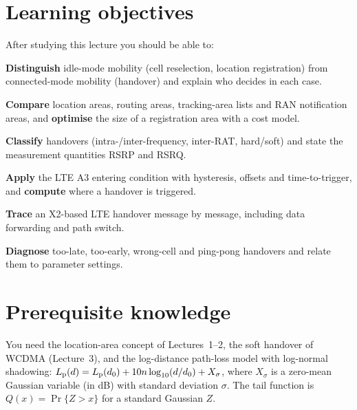 \documentclass[11pt,a4paper]{article}
\begin{document}
\ACNcover

\section{Learning objectives}
After studying this lecture you should be able to:
\begin{objectives}
  \item \textbf{Distinguish} idle-mode mobility (cell reselection, location registration) from
        connected-mode mobility (handover) and explain who decides in each case.
  \item \textbf{Compare} location areas, routing areas, tracking-area lists and RAN notification
        areas, and \textbf{optimise} the size of a registration area with a cost model.
  \item \textbf{Classify} handovers (intra-/inter-frequency, inter-RAT, hard/soft) and state the
        measurement quantities RSRP and RSRQ.
  \item \textbf{Apply} the LTE A3 entering condition with hysteresis, offsets and time-to-trigger,
        and \textbf{compute} where a handover is triggered.
  \item \textbf{Trace} an X2-based LTE handover message by message, including data forwarding and
        path switch.
  \item \textbf{Diagnose} too-late, too-early, wrong-cell and ping-pong handovers and relate them
        to parameter settings.
\end{objectives}

\section{Prerequisite knowledge}
You need the location-area concept of Lectures~1--2, the soft handover of WCDMA (Lecture~3),
and the log-distance path-loss model with log-normal shadowing:
$L_{\mathrm{p}}(d) = L_{\mathrm{p}}(d_0) + 10n\log_{10}(d/d_0) + X_\sigma$, where $X_\sigma$ is a zero-mean Gaussian
variable (in dB) with standard deviation $\sigma$. The tail function is
$Q(x) = \Pr\{Z > x\}$ for a standard Gaussian $Z$.
\end{document}

